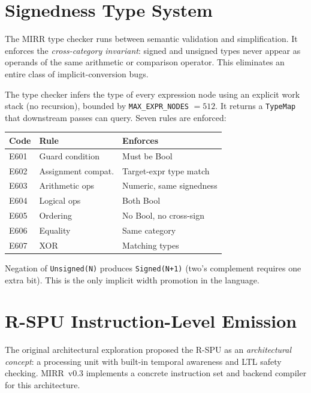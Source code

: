 \documentclass[conference]{IEEEtran}
\begin{document}
\section{Signedness Type System}\label{sec:typesys}

The MIRR type checker runs between semantic validation and simplification.
It enforces the \emph{cross-category invariant}: signed and unsigned
types never appear as operands of the same arithmetic or comparison
operator.  This eliminates an entire class of implicit-conversion bugs.

The type checker infers the type of every expression node using an
explicit work stack (no recursion), bounded by \texttt{MAX\_EXPR\_NODES}
$= 512$.  It returns a \texttt{TypeMap} that downstream passes can
query.  Seven rules are enforced:

\begin{center}
\footnotesize
\begin{tabular}{@{}lll@{}}
\toprule
\textbf{Code} & \textbf{Rule} & \textbf{Enforces} \\
\midrule
E601 & Guard condition & Must be Bool \\
E602 & Assignment compat. & Target-expr type match \\
E603 & Arithmetic ops & Numeric, same signedness \\
E604 & Logical ops & Both Bool \\
E605 & Ordering   & No Bool, no cross-sign \\
E606 & Equality   & Same category \\
E607 & XOR        & Matching types \\
\bottomrule
\end{tabular}
\end{center}

Negation of \texttt{Unsigned(N)} produces \texttt{Signed(N+1)} (two's
complement requires one extra bit).  This is the only implicit width
promotion in the language.

\section{R-SPU Instruction-Level Emission}\label{sec:rspu}

The original architectural exploration proposed the R-SPU as an
\emph{architectural concept}: a processing unit with built-in temporal
awareness and LTL safety checking.  MIRR~v0.3 implements a concrete
instruction set and backend compiler for this architecture.
\end{document}
